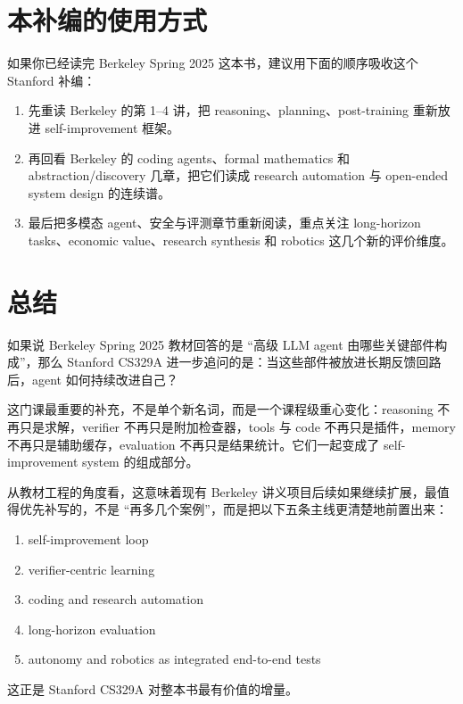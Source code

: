 \section{本补编的使用方式}

如果你已经读完 Berkeley Spring 2025 这本书，建议用下面的顺序吸收这个 Stanford 补编：
\begin{enumerate}
\item 先重读 Berkeley 的第 1--4 讲，把 reasoning、planning、post-training 重新放进 self-improvement 框架。
\item 再回看 Berkeley 的 coding agents、formal mathematics 和 abstraction/discovery 几章，把它们读成 research automation 与 open-ended system design 的连续谱。
\item 最后把多模态 agent、安全与评测章节重新阅读，重点关注 long-horizon tasks、economic value、research synthesis 和 robotics 这几个新的评价维度。
\end{enumerate}

\section{总结}

如果说 Berkeley Spring 2025 教材回答的是 ``高级 LLM agent 由哪些关键部件构成''，那么 Stanford CS329A 进一步追问的是：当这些部件被放进长期反馈回路后，agent 如何持续改进自己？

这门课最重要的补充，不是单个新名词，而是一个课程级重心变化：reasoning 不再只是求解，verifier 不再只是附加检查器，tools 与 code 不再只是插件，memory 不再只是辅助缓存，evaluation 不再只是结果统计。它们一起变成了 self-improvement system 的组成部分。

从教材工程的角度看，这意味着现有 Berkeley 讲义项目后续如果继续扩展，最值得优先补写的，不是 ``再多几个案例''，而是把以下五条主线更清楚地前置出来：
\begin{enumerate}
\item self-improvement loop
\item verifier-centric learning
\item coding and research automation
\item long-horizon evaluation
\item autonomy and robotics as integrated end-to-end tests
\end{enumerate}

这正是 Stanford CS329A 对整本书最有价值的增量。
